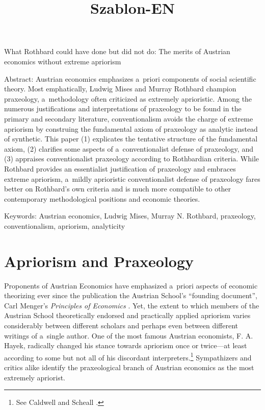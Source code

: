 \setcounter{secnumdepth}{1}







\title{Szablon-EN}



What Rothbard could have done but did not do: The merits of Austrian economics without extreme apriorism





Abstract: Austrian economics emphasizes a~priori components of social scientific theory. Most emphatically, Ludwig Mises and Murray Rothbard champion praxeology, a~methodology often criticized as extremely aprioristic. Among the numerous justifications and interpretations of praxeology to be found in the primary and secondary literature, conventionalism avoids the charge of extreme apriorism by construing the fundamental axiom of praxeology as analytic instead of synthetic. This paper (1) explicates the tentative structure of the fundamental axiom, (2) clarifies some aspects of a~conventionalist defense of praxeology, and (3) appraises conventionalist praxeology according to Rothbardian criteria. While Rothbard provides an essentialist justification of praxeology and embraces extreme apriorism, a~mildly aprioristic conventionalist defense of praxeology fares better on Rothbard's own criteria and is much more compatible to other contemporary methodological positions and economic theories.



Keywords: Austrian economics, Ludwig Mises, Murray N. Rothbard, praxeology, conventionalism, apriorism, analyticity



\section{Apriorism and Praxeology}

Proponents of Austrian Economics have emphasized a~priori aspects of economic theorizing ever since the publication the Austrian School's ``founding document'', Carl Menger's \textit{Principles of Economics} 
\parencite*[][]{}. %
 Yet, the extent to which members of the Austrian School theoretically endorsed and practically applied apriorism varies considerably between different scholars and perhaps even between different writings of a~single author. One of the most famous Austrian economists, F. A. Hayek, radically changed his stance towards apriorism once or twice---at least according to some but not all of his discordant interpreters.\footnote{See Caldwell 
\parencite*[][]{caldwell_skirmish_2009} %
 and Scheall 
\parencite*[][]{}.%
} Sympathizers and critics alike identify the praxeological branch of Austrian economics as the most extremely apriorist.



